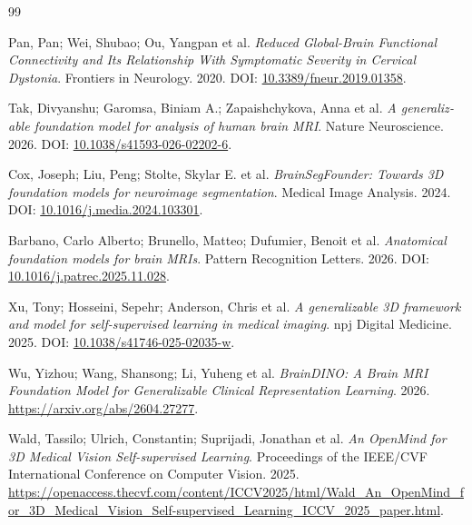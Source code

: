 \begin{thebibliography}{99}
\begin{otherlanguage}{english}
\end{otherlanguage}
\begin{otherlanguage}{english}
Pan, Pan; Wei, Shubao; Ou, Yangpan et al. \textit{{Reduced Global-Brain Functional Connectivity and Its Relationship With Symptomatic Severity in Cervical Dystonia}}. Frontiers in Neurology. 2020. DOI: \url{10.3389/fneur.2019.01358}.
\end{otherlanguage}
\begin{otherlanguage}{english}
Tak, Divyanshu; Garomsa, Biniam A.; Zapaishchykova, Anna et al. \textit{{A generalizable foundation model for analysis of human brain MRI}}. Nature Neuroscience. 2026. DOI: \url{10.1038/s41593-026-02202-6}.
\end{otherlanguage}
\begin{otherlanguage}{english}
Cox, Joseph; Liu, Peng; Stolte, Skylar E. et al. \textit{{BrainSegFounder: Towards 3D foundation models for neuroimage segmentation}}. Medical Image Analysis. 2024. DOI: \url{10.1016/j.media.2024.103301}.
\end{otherlanguage}
\begin{otherlanguage}{english}
Barbano, Carlo Alberto; Brunello, Matteo; Dufumier, Benoit et al. \textit{{Anatomical foundation models for brain MRIs}}. Pattern Recognition Letters. 2026. DOI: \url{10.1016/j.patrec.2025.11.028}.
\end{otherlanguage}
\begin{otherlanguage}{english}
Xu, Tony; Hosseini, Sepehr; Anderson, Chris et al. \textit{{A generalizable 3D framework and model for self-supervised learning in medical imaging}}. npj Digital Medicine. 2025. DOI: \url{10.1038/s41746-025-02035-w}.
\end{otherlanguage}
\begin{otherlanguage}{english}
Wu, Yizhou; Wang, Shansong; Li, Yuheng et al. \textit{{BrainDINO: A Brain MRI Foundation Model for Generalizable Clinical Representation Learning}}. 2026. \url{https://arxiv.org/abs/2604.27277}.
\end{otherlanguage}
\begin{otherlanguage}{english}
Wald, Tassilo; Ulrich, Constantin; Suprijadi, Jonathan et al. \textit{{An OpenMind for 3D Medical Vision Self-supervised Learning}}. Proceedings of the IEEE/CVF International Conference on Computer Vision. 2025. \url{https://openaccess.thecvf.com/content/ICCV2025/html/Wald_An_OpenMind_for_3D_Medical_Vision_Self-supervised_Learning_ICCV_2025_paper.html}.

\end{otherlanguage}
\end{thebibliography}
